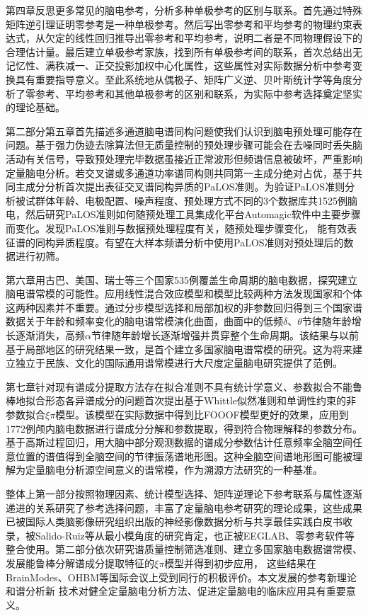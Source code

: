 第四章反思更多常见的脑电参考，分析多种单极参考的区别与联系。首先通过特殊矩阵逆引理证明零参考是一种单极参考。然后写出零参考和平均参考的物理约束表达式，从欠定的线性回归推导出零参考和平均参考，说明二者是不同物理假设下的合理估计量。最后建立单极参考家族，找到所有单极参考间的联系，首次总结出无记忆性、满秩减一、正交投影加权中心化属性，这些属性对实际数据分析中参考变换具有重要指导意义。至此系统地从偶极子、矩阵广义逆、贝叶斯统计学等角度分析了零参考、平均参考和其他单极参考的区别和联系，为实际中参考选择奠定坚实的理论基础。

第二部分第五章首先描述多通道脑电谱同构问题使我们认识到脑电预处理可能存在问题。基于强力伪迹去除算法但无质量控制的预处理步骤可能会在去噪同时丢失脑活动有关信号，导致预处理完毕数据虽接近正常波形但频谱信息被破坏，严重影响定量脑电分析。若交叉谱或多通道功率谱同构则共同第一主成分绝对占优，基于共同主成分分析首次提出表征交叉谱同构异质的PaLOS准则。为验证PaLOS准则分析被试群体年龄、电极配置、噪声程度、预处理方式不同的3个数据库共1525例脑电，然后研究PaLOS准则如何随预处理工具集成化平台Automagic软件中主要步骤而变化。发现PaLOS准则与数据预处理程度有关，随预处理步骤变化，
能有效表征谱的同构异质程度。有望在大样本频谱分析中使用PaLOS准则对预处理后的数据进行初筛。

第六章用古巴、美国、瑞士等三个国家535例覆盖生命周期的脑电数据，探究建立脑电谱常模的可能性。应用线性混合效应模型和模型比较两种方法发现国家和个体这两种因素并不重要。通过分步模型选择和局部加权的非参数回归得到三个国家谱数据关于年龄和频率变化的脑电谱常模演化曲面，曲面中的低频$\delta$、$\theta$节律随年龄增长逐渐消失，高频$\alpha$节律随年龄增长逐渐增强并贯穿整个生命周期。该结果与以前基于局部地区的研究结果一致，是首个建立多国家脑电谱常模的研究。这为将来建立独立于民族、文化的国际通用谱常模进行大尺度定量脑电研究提供了范例。

第七章针对现有谱成分提取方法存在拟合准则不具有统计学意义、参数拟合不能鲁棒地拟合形态各异谱成分的问题首次提出基于Whittle似然准则和单调性约束的非参数拟合$\xi\pi$模型。该模型在实际数据中得到比FOOOF模型更好的效果，应用到1772例颅内脑电数据进行谱成分分解和参数提取，得到符合物理解释的参数分布。基于高斯过程回归，用大脑中部分观测数据的谱成分参数估计任意频率全脑空间任意位置的谱值得到全脑空间的节律振荡谱地形图。这种全脑空间谱地形图可能被理解为定量脑电分析源空间意义的谱常模，作为溯源方法研究的一种基准。

整体上第一部分按照物理因素、统计模型选择、矩阵逆理论下参考联系与属性逐渐递进的关系研究了参考选择问题，丰富了定量脑电参考研究的理论成果，这些成果已被国际人类脑影像研究组织出版的神经影像数据分析与共享最佳实践白皮书收录，被Salido-Ruiz等从最小模角度的研究肯定，也正被EEGLAB、零参考软件等整合使用。第二部分依次研究谱质量控制筛选准则、建立多国家脑电数据谱常模、发展能鲁棒分解谱成分提取特征的$\xi\pi$模型并得到初步应用，
这些结果在BrainModes、OHBM等国际会议上受到同行的积极评价。本文发展的参考新理论和谱分析新
技术对健全定量脑电分析方法、促进定量脑电的临床应用具有重要意义。

